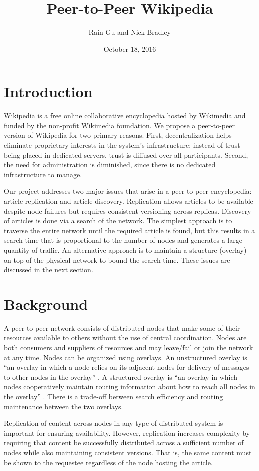\documentclass{article}
\title{Peer-to-Peer Wikipedia}
\author{Rain Gu and Nick Bradley}
\date{October 18, 2016}
\begin{document}
\maketitle

\section{Introduction}
Wikipedia is a free online collaborative encyclopedia hosted by Wikimedia and
funded by the non-profit Wikimedia foundation. We propose a peer-to-peer version
of Wikipedia for two primary reasons. First, decentralization helps eliminate
proprietary interests in the system's infrastructure: instead of trust being
placed in dedicated servers, trust is diffused over all participants. Second,
the need for administration is diminished, since there is no dedicated
infrastructure to manage.

Our project addresses two major issues that arise in a peer-to-peer encyclopedia:
article replication and article discovery. Replication allows articles to be
available despite node failures but requires consistent versioning across replicas.
Discovery of articles is done via a search of the network. The simplest approach
is to traverse the entire network until the required article is found, but this
results in a search time that is proportional to the number of nodes and generates
a large quantity of traffic. An alternative approach is to maintain a structure (overlay)
on top of the physical network to bound the search time. These issues are discussed
in the next section.

\section{Background}
A peer-to-peer network consists of distributed nodes that make some of their
resources available to others without the use of central coordination. Nodes are
both consumers and suppliers of resources and may leave/fail or join the network
at any time. Nodes can be organized using overlays. An unstructured overlay is
\enquote{an overlay in which a node relies on its adjacent nodes for delivery of
messages to other nodes in the overlay} \cite{byl08}. A structured overlay is
\enquote{an overlay in which nodes cooperatively maintain routing information
about how to reach all nodes in the overlay} \cite{byl08}. There is a trade-off
between search efficiency and routing maintenance between the two overlays.

Replication of content across nodes in any type of distributed system is important
for ensuring availability. However, replication increases complexity by requiring
that content be successfully distributed across a sufficient number of nodes while also
maintaining consistent versions. That is, the same content must be shown to the
requestee regardless of the node hosting the article.
\end{document}
